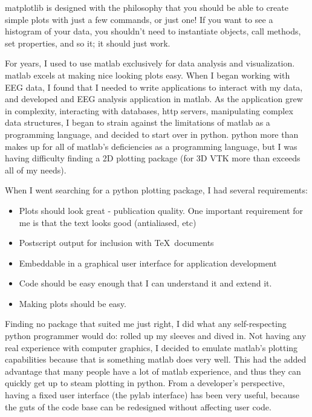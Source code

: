 \documentclass[twoside]{book}
\begin{document}
matplotlib is designed with the philosophy that you should be able to
create simple plots with just a few commands, or just one!  If you
want to see a histogram of your data, you shouldn't need to
instantiate objects, call methods, set properties, and so it; it
should just work.  

For years, I used to use matlab exclusively for data analysis and
visualization.  matlab excels at making nice looking plots easy.  When
I began working with EEG data, I found that I needed to write
applications to interact with my data, and developed and EEG analysis
application in matlab.  As the application grew in complexity,
interacting with databases, http servers, manipulating complex data
structures, I began to strain against the limitations of matlab as a
programming language, and decided to start over in python.  python
more than makes up for all of matlab's deficiencies as a programming
language, but I was having difficulty finding a 2D plotting package
(for 3D VTK more than exceeds all of my needs).

When I went searching for a python plotting package, I had several
requirements:

\begin{itemize}
  
\item Plots should look great - publication quality.  One important
  requirement for me is that the text looks good (antialiased, etc)

\item Postscript output for inclusion with \TeX\ documents
  
\item Embeddable in a graphical user interface for application
  development
  
\item Code should be easy enough that I can understand it and extend
  it.

\item Making plots should be easy.

\end{itemize}

\noindent Finding no package that suited me just right, I did what any
self-respecting python programmer would do: rolled up my sleeves and
dived in.  Not having any real experience with computer graphics, I
decided to emulate matlab's plotting capabilities because that is
something matlab does very well.  This had the added advantage that
many people have a lot of matlab experience, and thus they can quickly
get up to steam plotting in python.  From a developer's perspective,
having a fixed user interface (the pylab interface) has
been very useful, because the guts of the code base can be redesigned
without affecting user code.
\end{document}
